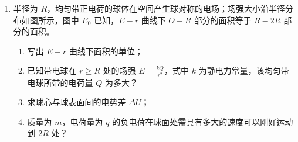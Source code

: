 \documentclass[\gkver]{gaokaozhenti}
\begin{document}
\begin{enumerate}
{$s=vt-\frac{1}{2}a't^{2}=\sqrt{\frac{2h}{g}\left[v_{0}^{2}-2\mu\left(1+\frac{m}{M}\right)gL\right]}-\mu h$

若 $t>t'$，小球落地前滑块已停止运动，则由 $0=v^{2}-2a's'$ 得

$v_{0}^{2}-2\mu\left(1+\frac{m}{M}\right)gL=2\mu gs'$

$s'=\frac{v_{0}^{2}}{2\mu g}-\left(1+\frac{m}{M}\right)L$
}

\item
半径为 $R$，均匀带正电荷的球体在空间产生球对称的电场；场强大小沿半径分布如图所示，图中 $E_{0}$ 已知，$E-r$ 曲线下 $O-R$ 部分的面积等于 $R-2R$ 部分的面积。
\begin{enumerate}
	\item
	写出 $E-r$ 曲线下面积的单位；
	\item
	已知带电球在 $r \geq R$ 处的场强 $E = \frac{kQ}{r^{2}}$，式中 $k$ 为静电力常量，该均匀带电球所带的电荷量 $Q$ 为多大？
	\item
	求球心与球表面间的电势差 $\Delta U$；
	\item
	质量为 $m$，电荷量为 $q$ 的负电荷在球面处需具有多大的速度可以刚好运动到 $2R$ 处？
\end{enumerate}
\onepicture[align=right, h=4.93cm]{}
\end{enumerate}
\end{document}
